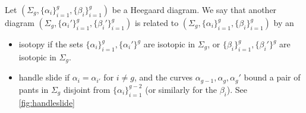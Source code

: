 

    Let $(\Sigma_g,\{\alpha_i\}_{i=1}^g, \{\beta_i\}_{i=1}^g)$ be a Heegaard diagram. We say that another diagram $(\Sigma_g,\{\alpha_i'\}_{i=1}^{g}, \{\beta_i'\}_{i=1}^{g})$ is related to $(\Sigma_g,\{\alpha_i\}_{i=1}^g, \{\beta_i\}_{i=1}^g)$ by an
    \begin{itemize}
        \item isotopy if the sets $\{\alpha_i\}_{i=1}^g, \{\alpha_i'\}^g$ are isotopic in $\Sigma_g$, or  $\{\beta_i\}_{i=1}^g, \{\beta_i'\}^g$ are isotopic in $\Sigma_g$.
        \item handle slide if $\alpha_i=\alpha_{i'}$ for $i\neq g$, and the curves $\alpha_{g-1}, \alpha_g, \alpha_g'$ bound a pair of pants in $\Sigma_g$ disjoint from $\{\alpha_i\}_{i=1}^{g-2}$ (or similarly for the $\beta_i$). See \cref{fig:handleslide}
    \end{itemize}

